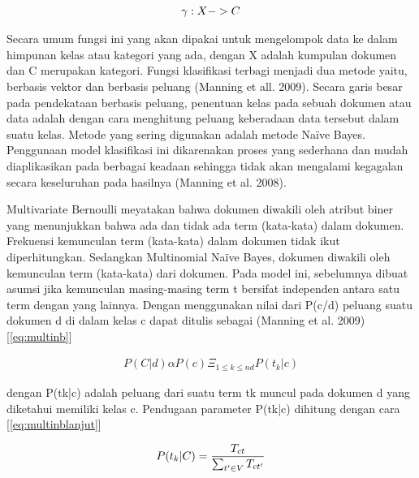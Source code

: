 \begin{equation}
\begin{split}
\tiny
\gamma : X -> C
\label{eq:klasifikasi}
\normalsize
\end{split}
\end{equation}

Secara umum fungsi ini yang akan dipakai untuk mengelompok data ke dalam himpunan kelas atau kategori yang ada, dengan X adalah kumpulan dokumen dan C merupakan kategori. Fungsi klasifikasi terbagi menjadi dua metode yaitu, berbasis vektor dan berbasis peluang (Manning et all. 2009). Secara garis besar pada pendekataan berbasis peluang, penentuan kelas pada sebuah dokumen atau data adalah dengan cara menghitung peluang keberadaan data tersebut dalam suatu kelas. Metode yang sering digunakan adalah metode Naïve Bayes. Penggunaan model klasifikasi ini dikarenakan proses yang sederhana dan mudah diaplikasikan pada berbagai keadaan sehingga tidak akan mengalami kegagalan secara keseluruhan pada hasilnya (Manning et al. 2008).\newline 

Multivariate Bernoulli meyatakan bahwa dokumen diwakili oleh atribut biner yang menunjukkan bahwa ada dan tidak ada term (kata-kata) dalam dokumen. Frekuensi kemunculan term (kata-kata) dalam dokumen tidak ikut diperhitungkan.  
Sedangkan Multinomial Naïve Bayes, dokumen diwakili oleh kemunculan term (kata-kata) dari dokumen. Pada model ini, sebelumnya dibuat asumsi jika kemunculan masing-masing term t bersifat independen antara satu term dengan yang lainnya. Dengan menggunakan nilai dari P(c/d) peluang suatu dokumen d di dalam kelas c dapat ditulis sebagai (Manning et al. 2009) [\ref{eq:multinb}]

\begin{equation}
\begin{split}
P(C|d) \alpha P(c) \Xi_{1\le k\le nd}P(t_k|c)
\label{eq:multinb}
\end{split}
\end{equation}

dengan P(tk|c) adalah peluang dari suatu term tk muncul pada dokumen d yang diketahui memiliki kelas c. Pendugaan parameter P(tk|c) dihitung dengan cara [\ref{eq:multinblanjut}]

\begin{equation}
\begin{split}
\tiny
P(t_k|C) = \frac{T_{ct}}{\sum _{t' \in V} T_{ct'}}
\label{eq:multinblanjut}
\normalsize
\end{split}
\end{equation}

